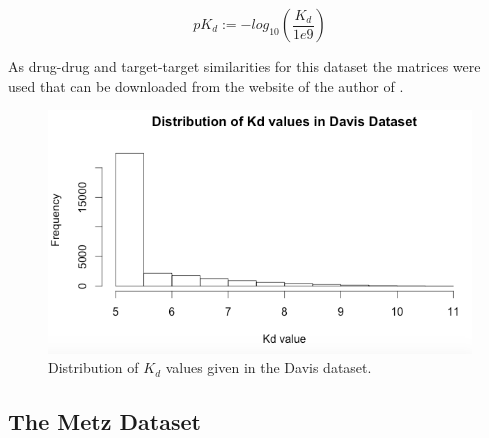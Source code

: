 \begin{equation}
pK_d:= -log_{10}(\frac{K_d}{1e9})
\end{equation}

As drug-drug and target-target similarities for this dataset the matrices were used that can be downloaded from the website of the author of \cite{pahikkala2014toward}.

\begin{figure}
\begin{center}
\includegraphics[scale=0.6]{davis_dist.png}
\end{center}
\caption{Distribution of $K_d$ values given in the Davis dataset.}
\end{figure}

\subsection{The Metz Dataset}

